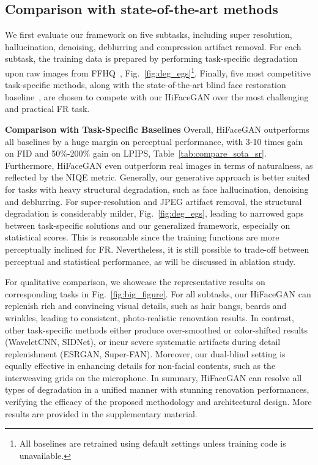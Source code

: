 \documentclass[sigconf]{acmart}
\begin{document}
\subsection{Comparison with state-of-the-art methods}\label{sec:sota}
We first evaluate our framework on five subtasks, including super resolution, hallucination, denoising, deblurring and compression artifact removal. For each subtask, the training data is prepared by performing task-specific degradation upon raw images from FFHQ~\cite{stylegan_ffhq}, Fig.~\ref{fig:deg_egs}\footnote{All baselines are retrained using default settings unless training code is unavailable.}. Finally, five most competitive task-specific methods, along with the state-of-the-art blind face restoration baseline~\cite{BlindFR-ECCV2018}, are chosen to compete with our HiFaceGAN over the most challenging and practical FR task.

\textbf{Comparison with Task-Specific Baselines}
Overall, HiFaceGAN outperforms all baselines by a huge margin on perceptual performance, with 3-10 times gain on FID and 50\%-200\% gain on LPIPS, Table~\ref{tab:compare_sota_sr}. Furthermore, HiFaceGAN even outperform real images in terms of naturalness, as reflected by the NIQE metric. Generally, our generative approach is better suited for tasks with heavy structural degradation, such as face hallucination, denoising and deblurring. For super-resolution and JPEG artifact removal, the structural degradation is considerably milder, Fig.~\ref{fig:deg_egs}, leading to narrowed gaps between task-specific solutions and our generalized framework, especially on statistical scores. This is reasonable since the training functions are more perceptually inclined for FR. Nevertheless, it is still possible to trade-off between perceptual and statistical performance, as will be discussed in ablation study.

For qualitative comparison, we showcase the representative results on corresponding tasks in Fig.~\ref{fig:big_figure}. For all subtasks, our HiFaceGAN can replenish rich and convincing visual details, such as hair bangs, beards and wrinkles, leading to consistent, photo-realistic renovation results. In contrast, other task-specific methods either produce over-smoothed or color-shifted results (WaveletCNN, SIDNet), or incur severe systematic artifacts during detail replenishment (ESRGAN, Super-FAN). Moreover, our dual-blind setting is equally effective in enhancing details for non-facial contents, such as the interweaving grids on the microphone. In summary, HiFaceGAN can resolve all types of degradation in a unified manner with stunning renovation performances, verifying the efficacy of the proposed methodology and architectural design. More results are provided in the supplementary material.
\end{document}
